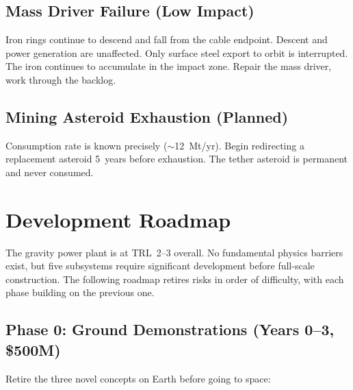 \documentclass[12pt,letterpaper]{article}
\begin{document}
\subsection{Mass Driver Failure (Low Impact)}

Iron rings continue to descend and fall from the cable endpoint. Descent and power generation are unaffected. Only surface steel export to orbit is interrupted. The iron continues to accumulate in the impact zone. Repair the mass driver, work through the backlog.

\subsection{Mining Asteroid Exhaustion (Planned)}

Consumption rate is known precisely ($\sim$12~Mt/yr). Begin redirecting a replacement asteroid 5~years before exhaustion. The tether asteroid is permanent and never consumed.

\section{Development Roadmap}

The gravity power plant is at TRL~2--3 overall. No fundamental physics barriers exist, but five subsystems require significant development before full-scale construction. The following roadmap retires risks in order of difficulty, with each phase building on the previous one.

\subsection{Phase 0: Ground Demonstrations (Years 0--3, \$500M)}

Retire the three novel concepts on Earth before going to space:
\end{document}
